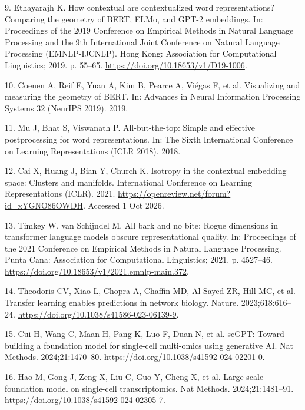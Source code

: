 \documentclass[
  11pt,
]{article}
\newlength{\cslhangindent}
\newenvironment{CSLReferences}[2] %
 {\begin{list}{}{%
  \setlength{\itemindent}{0pt}
  \setlength{\leftmargin}{0pt}
  \setlength{\parsep}{0pt}
  \ifodd #1
   \setlength{\leftmargin}{\cslhangindent}
   \setlength{\itemindent}{-1\cslhangindent}
  \fi
  \setlength{\itemsep}{#2\baselineskip}}}
 {\end{list}}
\begin{document}
\begin{CSLReferences}{0}{1}
9. Ethayarajh K. How contextual are contextualized word representations?
{Comparing} the geometry of {BERT}, {ELMo}, and {GPT-2} embeddings. In:
{Proceedings of the 2019 Conference on Empirical Methods in Natural
Language Processing and the 9th International Joint Conference on
Natural Language Processing (EMNLP-IJCNLP)}. Hong Kong: Association for
Computational Linguistics; 2019. p. 55--65.
\url{https://doi.org/10.18653/v1/D19-1006}.

10. Coenen A, Reif E, Yuan A, Kim B, Pearce A, Viégas F, et al.
Visualizing and measuring the geometry of {BERT}. In: {Advances in
Neural Information Processing Systems 32 (NeurIPS 2019)}. 2019.

11. Mu J, Bhat S, Viswanath P. All-but-the-top: Simple and effective
postprocessing for word representations. In: {The Sixth International
Conference on Learning Representations (ICLR 2018)}. 2018.

12. Cai X, Huang J, Bian Y, Church K. Isotropy in the contextual
embedding space: Clusters and manifolds. International Conference on
Learning Representations (ICLR). 2021.
\url{https://openreview.net/forum?id=xYGNO86OWDH}. Accessed 1 Oct 2026.

13. {Timkey W, van Schijndel M}. All bark and no bite: Rogue dimensions
in transformer language models obscure representational quality. In:
{Proceedings of the 2021 Conference on Empirical Methods in Natural
Language Processing}. Punta Cana: Association for Computational
Linguistics; 2021. p. 4527--46.
\url{https://doi.org/10.18653/v1/2021.emnlp-main.372}.

14. Theodoris CV, Xiao L, Chopra A, Chaffin MD, Al Sayed ZR, Hill MC, et
al. Transfer learning enables predictions in network biology. Nature.
2023;618:616--24. \url{https://doi.org/10.1038/s41586-023-06139-9}.

15. Cui H, Wang C, Maan H, Pang K, Luo F, Duan N, et al. {scGPT}: Toward
building a foundation model for single-cell multi-omics using generative
{AI}. Nat Methods. 2024;21:1470--80.
\url{https://doi.org/10.1038/s41592-024-02201-0}.

16. Hao M, Gong J, Zeng X, Liu C, Guo Y, Cheng X, et al. Large-scale
foundation model on single-cell transcriptomics. Nat Methods.
2024;21:1481--91. \url{https://doi.org/10.1038/s41592-024-02305-7}.


\end{CSLReferences}
\end{document}
